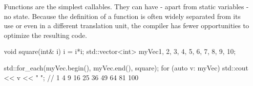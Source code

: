 Functions are the simplest callables. They can have - apart from static variables - no state. Because the definition of a function is often widely separated from its use or even in a different translation unit, the compiler has fewer opportunities to optimize the resulting code.

\begin{cpp}
void square(int& i){ i = i*i; }
std::vector<int> myVec{1, 2, 3, 4, 5, 6, 7, 8, 9, 10};

std::for_each(myVec.begin(), myVec.end(), square);
for (auto v: myVec) std::cout << v << " "; // 1 4 9 16 25 36 49 64 81 100
\end{cpp}






